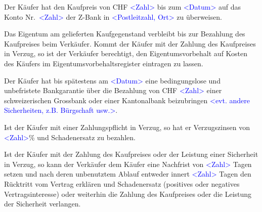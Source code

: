 \documentclass[parskip=half]{scrreprt}
\begin{document}
\begin{contract}
\parnumbertrue





Der Käufer hat den Kaufpreis von CHF \textcolor{blue}{<Zahl>} bis zum \textcolor{blue}{<Datum>} auf das Konto Nr.~\textcolor{blue}{<Zahl>} der Z-Bank in \textcolor{blue}{<Postleitzahl, Ort>} zu überweisen.

Das Eigentum am gelieferten Kaufgegenstand verbleibt bis zur Bezahlung des Kaufpreises beim Verkäufer. Kommt der Käufer mit der Zahlung des Kaufpreises in Verzug, so ist der Verkäufer berechtigt, den Eigentumsvorbehalt auf Kosten des Käufers im Eigentumsvorbehaltsregister eintragen zu lassen.

Der Käufer hat bis spätestens am \textcolor{blue}{<Datum>} eine bedingungslose und unbefristete Bankgarantie über die Bezahlung von CHF \textcolor{blue}{<Zahl>} einer schweizerischen Grossbank oder einer Kantonalbank beizubringen \textcolor{blue}{<evt. andere Sicherheiten, z.B. Bürgschaft usw.>}.

\parnumbertrue

Ist der Käufer mit einer Zahlungspflicht in Verzug, so hat er Verzugszinsen von \textcolor{blue}{<Zahl>}\% und Schadenersatz zu bezahlen.

Ist der Käufer mit der Zahlung des Kaufpreises oder der Leistung einer Sicherheit in Verzug, so kann der Verkäufer dem Käufer eine Nachfrist von \textcolor{blue}{<Zahl>} Tagen setzen und nach deren unbenutztem Ablauf entweder innert \textcolor{blue}{<Zahl>} Tagen den Rücktritt vom Vertrag erklären und Schadenersatz (positives oder negatives Vertragsinteresse) oder weiterhin die Zahlung des Kaufpreises oder die Leistung der Sicherheit verlangen.



\end{contract}
\end{document}
